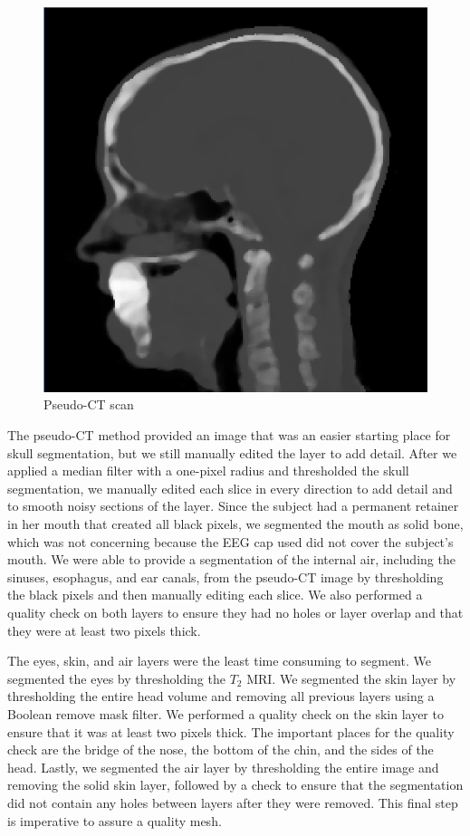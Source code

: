 \begin{figure}[H]
\begin{center}
\includegraphics[width=.75\textwidth]{Figures/pseudo_CT}
\caption{Pseudo-CT scan}
\label{fig:ct}
\end{center}
\end{figure}

The pseudo-CT method provided an image that was an easier starting place for skull segmentation, but we still manually edited the layer to add detail. After we applied a median filter with a one-pixel radius and thresholded the skull segmentation, we manually edited each slice in every direction to add detail and to smooth noisy sections of the layer. Since the subject had a permanent retainer in her mouth that created all black pixels, we segmented the mouth as solid bone, which was not concerning because the EEG cap used did not cover the subject's mouth. We were able to provide a segmentation of the internal air, including the sinuses, esophagus, and ear canals, from the pseudo-CT image by thresholding the black pixels and then manually editing each slice. We also performed a quality check on both layers to ensure they had no holes or layer overlap and that they were at least two pixels thick.

The eyes, skin, and air layers were the least time consuming to segment. We segmented the eyes by thresholding the $T_2$ MRI. We segmented the skin layer by thresholding the entire head volume and removing all previous layers using a Boolean remove mask filter. We performed a quality check on the skin layer to ensure that it was at least two pixels thick. The important places for the quality check are the bridge of the nose, the bottom of the chin, and the sides of the head. Lastly, we segmented the air layer by thresholding the entire image and removing the solid skin layer, followed by a check to ensure that the segmentation did not contain any holes between layers after they were removed. This final step is imperative to assure a quality mesh.

